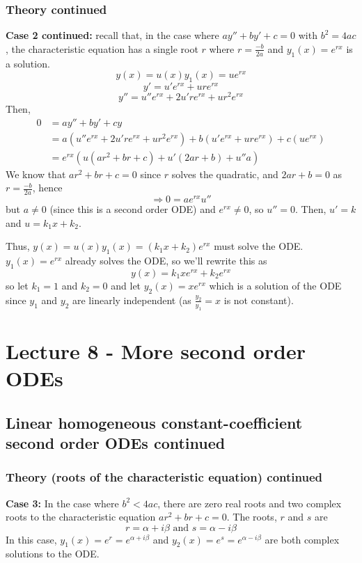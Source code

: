 \documentclass[11pt]{article}
\begin{document}
\subsubsection{Theory continued}
	\textbf{Case 2 continued:} recall that, in the case where $a y'' +  by' + c = 0$ with $b^2 = 4ac$, the characteristic equation has a single root $r$ where $r = \frac{-b}{2a}$ and $y_1(x) = e^{r x}$ is a solution.
		$$ y(x) = u(x)y_1(x) = u e^{r x} $$
		$$ y' = u' e^{rx} + u r e^{rx} $$
		$$ y'' = u'' e^{rx} + 2 u' r e^{rx} + u r^2 e^{rx} $$
	Then,
		\begin{align*}
			0 &= ay'' + by' + cy \\
				&= a(u'' e^{rx} + 2 u' r e^{rx} + u r^2 e^{rx}) + b (u' e^{rx} + u r e^{rx}) + c (u e^{rx}) \\
				&= e^{rx}(u (ar^2 + b r + c) + u' (2ar + b) + u'' a)
		\end{align*}
	We know that $a r^2 + b r + c = 0$ since $r$ solves the quadratic, and $2 a r + b = 0$ as $r = \frac{-b}{2a}$, hence
		$$ \Rightarrow 0 = a e^{rx} u'' $$
	but $a \neq 0$ (since this is a second order ODE) and $e^{rx} \neq 0$, so $u'' = 0$. Then, $u' = k$ and $u = k_1x + k_2$.

	Thus, $y(x) = u(x) y_1 (x) = (k_1 x + k_2) e^{rx}$ must solve the ODE. $y_1 (x) = e^{rx}$ already solves the ODE, so we'll rewrite this as
		$$ y(x) = k_1 x e^{rx} + k_2 e^{rx} $$
	so let $k_1 = 1$ and $k_2 = 0$ and let $y_2 (x) = x e^{rx}$ which is a solution of the ODE since $y_1$ and $y_2$ are linearly independent (as $\frac{y_2}{y_1} = x$ is not constant).

\section{Lecture 8 - More second order ODEs}
\subsection{Linear homogeneous constant-coefficient second order ODEs continued}
\subsubsection{Theory (roots of the characteristic equation) continued}
	\textbf{Case 3:} In the case where $b^2 < 4ac$, there are zero real roots and two complex roots to the characteristic equation $a r^2 + b r + c = 0$. The roots, $r$ and $s$ are
		$$ r = \alpha + i \beta \text{ and } s = \alpha - i \beta $$
	In this case, $y_1 (x) = e^r = e^{\alpha + i \beta}$ and $y_2 (x) = e^s = e^{\alpha - i \beta}$ are both complex solutions to the ODE.
\end{document}
